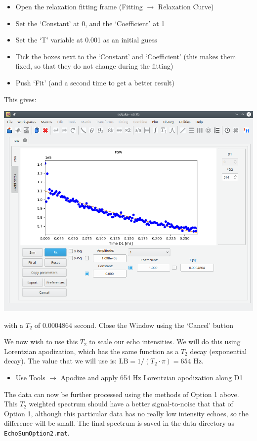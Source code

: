 \documentclass[11pt,a4paper]{article}
\begin{document}
\begin{itemize}
  \item Open the relaxation fitting frame (Fitting $\longrightarrow$ Relaxation Curve)
	\item Set the `Constant' at 0, and the `Coefficient' at 1
	\item Set the `T' variable at 0.001 as an initial guess
	 \item Tick the boxes next to the `Constant' and `Coefficient' (this makes them fixed, so that they
		do not change during the fitting)
	\item Push `Fit' (and a second time to get a better result)
\end{itemize}
This gives:
\begin{center}
\includegraphics[width=0.7\linewidth]{Figs/Fig8.png}
\end{center}
with a $T_2$ of 0.0004864 second. Close the Window using the `Cancel' button

We now wish to use this $T_2$ to scale our echo intensities. We will do this using Lorentzian
apodization, which has the same function as a $T_2$ decay (exponential decay). The value that we
will use is: $\text{LB} = 1/(T_2 \cdot \pi) = 654$ Hz.


\begin{itemize}
  \item Use Tools $\longrightarrow$ Apodize and apply 654 Hz Lorentzian apodization along D1
\end{itemize}
The data can now be further processed using the methods of Option 1 above. This $T_2$ weighted
spectrum should have a better signal-to-noise that that of Option 1, although this particular data
has no really low intensity echoes, so the difference will be small. The final spectrum is saved in
the data directory as \texttt{EchoSumOption2.mat}.
\end{document}
